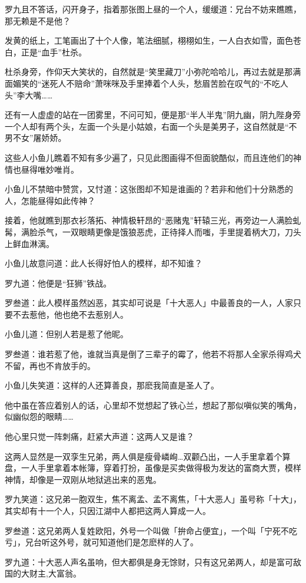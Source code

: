 \documentclass[12pt,oneside]{book}
\begin{document}
罗九且不答话，闪开身子，指着那张图上昼的一个人，缓缓道：兄台不妨来瞧瞧，那无赖是不是他？

发黄的纸上，工笔画出了十个人像，笔法细腻，栩栩如生，一人白衣如雪，面色苍白，正是``血手''杜杀。

杜杀身旁，作仰天大笑状的，自然就是``笑里藏刀''小弥陀哈哈儿，再过去就是那满面媚笑的``迷死人不赔命''萧咪咪及手里捧着个人头，愁眉苦脸在叹气的``不吃人头''李大嘴\ldots\ldots{}

还有一人虚虚的站在一团雾里，不问可知，便是那``半人半鬼''阴九幽，阴九陛身旁一个人却有两个头，左面一个头是小姑娘，右面一个头是美男子，这自然就是``不男不女''屠娇娇。

这些人小鱼儿瞧着不知有多少遍了，只见此图画得不但面貌酷似，而且连他们的神情也昼得唯妙唯肖。

小鱼儿不禁暗中赞赏，又忖道：这张图却不知是谁画的？若非和他们十分熟悉的人，怎能昼得如此传神？

接着，他就瞧到那衣衫落拓、神情极轩昂的``恶赌鬼''轩辕三光，再旁边一人满脸虬髯，满脸杀气，一双眼睛更像是饿狼恶虎，正待择人而嗤，手里提着柄大刀，刀头上鲜血淋漓。

小鱼儿故意问道：此人长得好怕人的模样，却不知谁？

罗九道：他便是``狂狮''铁战。

罗叁道：此人模样虽然凶恶，其实却可说是「十大恶人」中最善良的一人，人家只要不去惹他，他也绝不去惹别人。

小鱼儿道：但别人若是惹了他昵。

罗叁道：谁若惹了他，谁就当真是倒了三辈子的霉了，他若不将那人全家杀得鸡犬不留，再也不肯放手的。

小鱼儿失笑道：这样的人还算善良，那麽我简直是圣人了。

他中虽在答应着别人的话，心里却不觉想起了铁心兰，想起了那似嗔似笑的嘴角，似幽似怨的眼睛\ldots\ldots{}

他心里只觉一阵刺痛，赶紧大声道：这两人又是谁？

这两人显然是一双孪生兄弟，两人俱是瘦骨嶙峋\ldots 双颧凸出，一人手里拿着个算盘，一人手里拿着本帐簿，穿着打扮，虽像是买卖做得极为发达的富商大贾，模样神情，却像是一双刚从地狱逃出来的恶鬼。

罗九笑道：这兄弟一胞双生，焦不离孟、孟不离焦，「十大恶人」虽号称「十大」，其实却有十一个人，只因江湖中人都把这两人算成一人。

罗叁道：这兄弟两人复姓欧阳，外号一个叫做「拚命占便宜」，一个叫「宁死不吃亏」，兄台听这外号，就可知道他们是怎麽样的人了。

罗九道：十大恶人声名虽响，但大都俱是身无馀财，只有这兄弟两人，却是富可敌国的大财主,大富翁。
\end{document}
